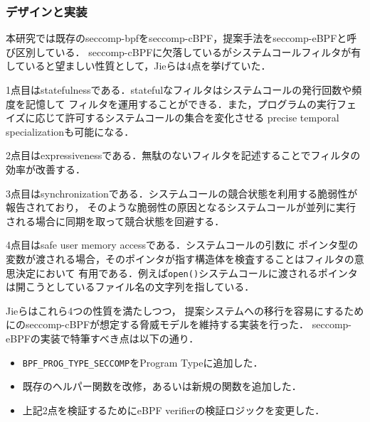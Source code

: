 \documentclass[platex,a4j,10pt,twoside,twocolumn,dvipdfmx]{jsarticle}
\begin{document}
    \subsubsection{デザインと実装}
      本研究では既存のseccomp-bpfをseccomp-cBPF，提案手法をseccomp-eBPFと呼び区別している．
      seccomp-cBPFに欠落しているがシステムコールフィルタが有していると望ましい性質として，Jieらは4点を挙げていた．

      1点目はstatefulnessである．statefulなフィルタはシステムコールの発行回数や頻度を記憶して
      フィルタを運用することができる．また，プログラムの実行フェイズに応じて許可するシステムコールの集合を変化させる
      precise temporal specializationも可能になる．
      
      2点目はexpressivenessである．無駄のないフィルタを記述することでフィルタの効率が改善する．
      
      3点目はsynchronizationである．システムコールの競合状態を利用する脆弱性が報告されており，
      そのような脆弱性の原因となるシステムコールが並列に実行される場合に同期を取って競合状態を回避する．

      4点目はsafe user memory accessである．システムコールの引数に
      ポインタ型の変数が渡される場合，そのポインタが指す構造体を検査することはフィルタの意思決定において
      有用である．例えば\texttt{open()}システムコールに渡されるポインタは開こうとしているファイル名の文字列を指している．
      
      Jieらはこれら4つの性質を満たしつつ，
      提案システムへの移行を容易にするためにのseccomp-cBPFが想定する脅威モデルを維持する実装を行った．
      seccomp-eBPFの実装で特筆すべき点は以下の通り．
      \begin{itemize}
        \item \texttt{BPF\_PROG\_TYPE\_SECCOMP}をProgram Typeに追加した．
        \item 既存のヘルパー関数を改修，あるいは新規の関数を追加した．
        \item 上記2点を検証するためにeBPF verifierの検証ロジックを変更した．
      \end{itemize}
      
\end{document}
